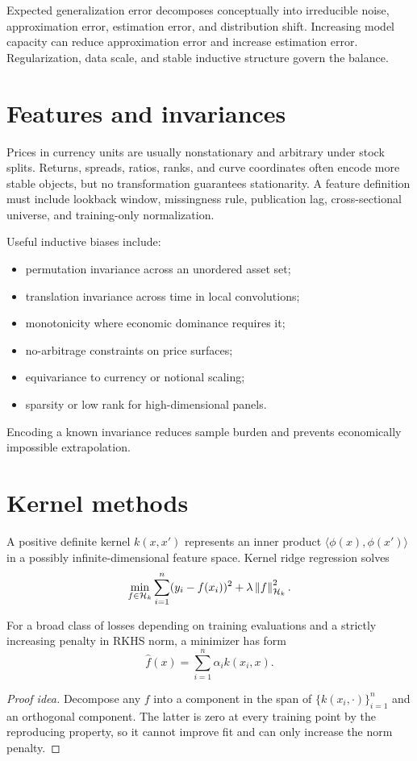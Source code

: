 Expected generalization error decomposes conceptually into irreducible noise,
approximation error, estimation error, and distribution shift. Increasing model
capacity can reduce approximation error and increase estimation error. Regularization,
data scale, and stable inductive structure govern the balance.

\section{Features and invariances}

Prices in currency units are usually nonstationary and arbitrary under stock splits.
Returns, spreads, ratios, ranks, and curve coordinates often encode more stable
objects, but no transformation guarantees stationarity. A feature definition must
include lookback window, missingness rule, publication lag, cross-sectional universe,
and training-only normalization.

Useful inductive biases include:

\begin{itemize}
\item permutation invariance across an unordered asset set;
\item translation invariance across time in local convolutions;
\item monotonicity where economic dominance requires it;
\item no-arbitrage constraints on price surfaces;
\item equivariance to currency or notional scaling;
\item sparsity or low rank for high-dimensional panels.
\end{itemize}

Encoding a known invariance reduces sample burden and prevents economically
impossible extrapolation.

\section{Kernel methods}

A positive definite kernel $k(x,x')$ represents an inner product
$\langle\phi(x),\phi(x')\rangle$ in a possibly infinite-dimensional feature space.
Kernel ridge regression solves
\[
\min_{f\in\mathcal H_k}
\sum_{i=1}^n(y_i-f(x_i))^2+\lambda\left\lVert f\right\rVert_{\mathcal H_k}^2.
\]

\begin{theorem}
For a broad class of losses depending on training evaluations and a strictly
increasing penalty in RKHS norm, a minimizer has form
\[
\widehat f(x)=\sum_{i=1}^n\alpha_i k(x_i,x).
\]
\end{theorem}
\begin{proof}[Proof idea]
Decompose any $f$ into a component in the span of
$\{k(x_i,\cdot)\}_{i=1}^n$ and an orthogonal component. The latter is zero at every
training point by the reproducing property, so it cannot improve fit and can only
increase the norm penalty.
\end{proof}

